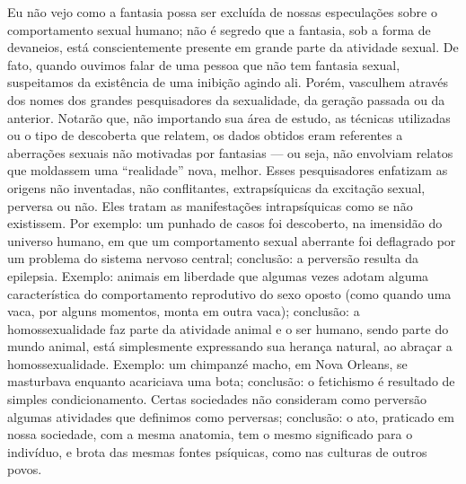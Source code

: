 Eu não vejo como a fantasia possa ser excluída de nossas
especulações sobre o comportamento sexual humano; não é segredo que a
fantasia, sob a forma de devaneios, está conscientemente presente em
grande parte da atividade sexual. De fato, quando ouvimos falar de uma
pessoa que não tem fantasia sexual, suspeitamos da existência de uma
inibição agindo ali. Porém, vasculhem através dos nomes dos grandes
pesquisadores da sexualidade, da geração passada ou da anterior.
Notarão que, não importando sua área de estudo, as técnicas utilizadas
ou o tipo de descoberta que relatem, os dados obtidos eram referentes a
aberrações sexuais não motivadas por fantasias --- ou seja, não envolviam
relatos que moldassem uma ``realidade'' nova,
melhor. Esses pesquisadores enfatizam as origens não inventadas, não
conflitantes, \mbox{extrapsíquicas} da excitação sexual, perversa ou não.
Eles tratam as manifestações intrapsíquicas como se não existissem. Por
exemplo: um punhado de casos foi descoberto, na imensidão do universo
humano, em que um comportamento sexual aberrante foi deflagrado por um
problema do sistema nervoso central; conclusão: a perversão resulta da
epilepsia. Exemplo: animais em liberdade que algumas vezes adotam
alguma característica do comportamento reprodutivo do sexo oposto (como
quando uma vaca, por alguns momentos, monta em outra vaca); conclusão:
a homossexualidade faz parte da atividade animal e o ser humano, sendo
parte do mundo animal, está simplesmente expressando sua herança
natural, ao abraçar a homossexualidade. Exemplo: um chimpanzé macho,\idxanim{} em
Nova Orleans, se masturbava enquanto acariciava uma bota; conclusão: o
fetichismo é resultado de simples condicionamento.\idxcond{} Certas sociedades
não consideram como perversão algumas atividades que definimos como
perversas; conclusão: o ato, praticado em nossa sociedade, com a mesma
anatomia, tem o mesmo significado para o indivíduo, e brota das mesmas
fontes psíquicas, como nas culturas\idxrela{} de outros povos.

